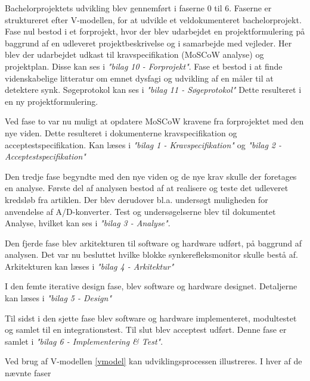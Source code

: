 Bachelorprojektets udvikling blev gennemført i faserne 0 til 6. Faserne er struktureret efter V-modellen\cite{IngeniorhojskolenAarhusUniversiteta}, for at udvikle et veldokumenteret bachelorprojekt. Fase nul bestod i et forprojekt, hvor der blev udarbejdet en projektformulering på baggrund af en udleveret projektbeskrivelse og i samarbejde med vejleder. Her blev der udarbejdet udkast til kravspecifikation (MoSCoW analyse) og projektplan. Disse kan ses i \textit{"bilag 10 - Forprojekt"}. Fase et bestod i at finde videnskabelige litteratur om emnet dysfagi og udvikling af en måler til at detektere synk. Søgeprotokol kan ses i \textit{"bilag 11 - Søgeprotokol"} Dette resulteret i en ny projektformulering.

Ved fase to var nu muligt at opdatere MoSCoW kravene fra forprojektet med den nye viden. Dette resulteret i dokumenterne kravspecifikation og acceptestspecifikation. Kan læses i \textit{"bilag 1 - Kravspecifikation"} og \textit{"bilag 2 - Acceptestspecifikation"}

Den tredje fase begyndte med den nye viden og de nye krav skulle der foretages en analyse. Første del af analysen bestod af at realisere og teste det udleveret kredsløb fra artiklen. Der blev derudover bl.a. undersøgt muligheden for anvendelse af A/D-konverter. Test og undersøgelserne blev til dokumentet Analyse, hvilket kan ses i \textit{"bilag 3 - Analyse"}.

Den fjerde fase blev arkitekturen til software og hardware udført, på baggrund af analysen. Det var nu besluttet hvilke blokke synkerefleksmonitor skulle bestå af. Arkitekturen kan læses i \textit{"bilag 4 - Arkitektur"}

I den femte iterative design fase, blev software og hardware designet. Detaljerne kan læses i \textit{"bilag 5 - Design"}

Til sidst i den sjette fase blev software og hardware implementeret, modultestet og samlet til en integrationstest. Til slut blev acceptest udført. Denne fase er samlet i \textit{"bilag 6 - Implementering \& Test"}.

Ved brug af V-modellen \ref{vmodel} kan udviklingsprocessen illustreres. I hver af de nævnte faser 

